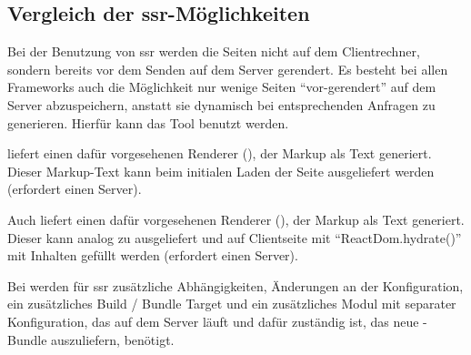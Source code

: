 \subsection{Vergleich der \acrlong{ssr}-Möglichkeiten}
Bei der Benutzung von \gls{ssr} werden die Seiten nicht auf dem Clientrechner, sondern bereits vor dem Senden auf dem Server gerendert. Es besteht bei allen Frameworks auch die Möglichkeit nur wenige Seiten \enquote{vor-gerendert} auf dem Server abzuspeichern, anstatt sie dynamisch bei entsprechenden Anfragen zu generieren. Hierfür kann das  Tool  benutzt werden.

 liefert einen dafür vorgesehenen Renderer (), der Markup als Text generiert. Dieser Markup-Text kann beim initialen Laden der Seite ausgeliefert werden (erfordert einen  Server).

Auch  liefert einen dafür vorgesehenen Renderer (), der Markup als Text generiert. Dieser kann analog zu  ausgeliefert und auf Clientseite mit \enquote{ReactDom.hydrate()} mit Inhalten gefüllt werden (erfordert einen  Server).
    
Bei  werden für \gls{ssr} zusätzliche Abhängigkeiten, Änderungen an der Konfiguration, ein zusätzliches Build / Bundle Target und ein zusätzliches Modul mit separater Konfiguration, das auf dem Server läuft und dafür zuständig ist, das neue -Bundle auszuliefern, benötigt.

